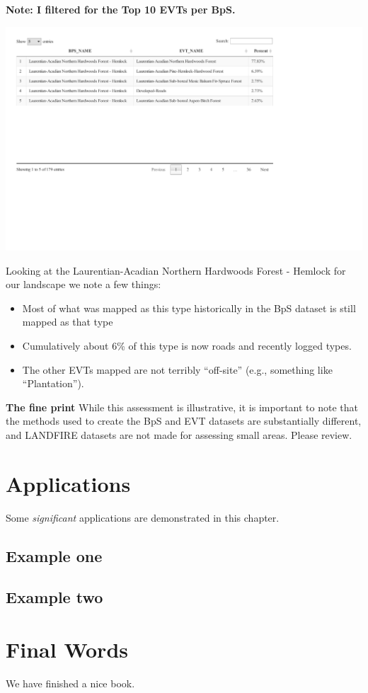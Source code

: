 \documentclass[
]{book}
\providecommand{\tightlist}{%
  \setlength{\itemsep}{0pt}\setlength{\parskip}{0pt}}
\begin{document}
\textbf{Note: I filtered for the Top 10 EVTs per BpS.}

\includegraphics{FSCBook_files/figure-latex/bpsEvtDT-1.pdf}

Looking at the Laurentian-Acadian Northern Hardwoods Forest - Hemlock for our landscape we note a few things:

\begin{itemize}
\tightlist
\item
  Most of what was mapped as this type historically in the BpS dataset is still mapped as that type
\item
  Cumulatively about 6\% of this type is now roads and recently logged types.
\item
  The other EVTs mapped are not terribly ``off-site'' (e.g., something like ``Plantation'').
\end{itemize}

\textbf{The fine print}
While this assessment is illustrative, it is important to note that the methods used to create the BpS and EVT datasets are substantially different, and LANDFIRE datasets are not made for assessing small areas. Please review.

\hypertarget{applications}{%
\chapter{Applications}\label{applications}}

Some \emph{significant} applications are demonstrated in this chapter.

\hypertarget{example-one}{%
\section{Example one}\label{example-one}}

\hypertarget{example-two}{%
\section{Example two}\label{example-two}}

\hypertarget{final-words}{%
\chapter{Final Words}\label{final-words}}

We have finished a nice book.
\end{document}
